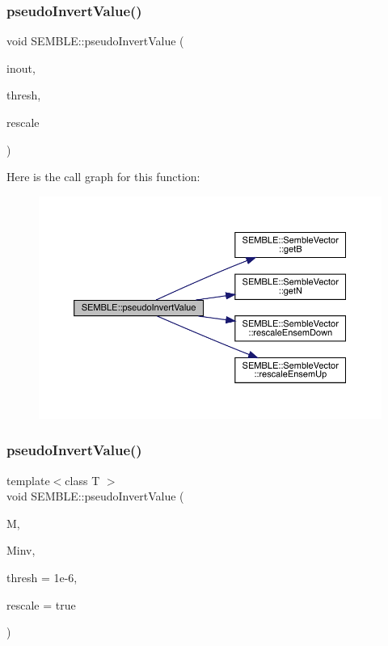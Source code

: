 \subsubsection{\texorpdfstring{pseudoInvertValue()}{pseudoInvertValue()}\hspace{0.1cm}{\footnotesize\ttfamily [1/2]}}
{\footnotesize\ttfamily void S\+E\+M\+B\+L\+E\+::pseudo\+Invert\+Value (\begin{DoxyParamCaption}\item[{\mbox{\hyperlink{structSEMBLE_1_1SembleVector}{Semble\+Vector}}$<$ double $>$ \&}]{inout,  }\item[{double}]{thresh,  }\item[{bool}]{rescale }\end{DoxyParamCaption})}

Here is the call graph for this function\+:
\nopagebreak
\begin{figure}[H]
\begin{center}
\leavevmode
\includegraphics[width=350pt]{d7/dfd/namespaceSEMBLE_aeba19d69ca776dd563e7ccb9975fa4c7_cgraph}
\end{center}
\end{figure}
\mbox{\label{namespaceSEMBLE_abf6d50f5d45b7e87cafac5e1ad6c5225}} 
\subsubsection{\texorpdfstring{pseudoInvertValue()}{pseudoInvertValue()}\hspace{0.1cm}{\footnotesize\ttfamily [2/2]}}
{\footnotesize\ttfamily template$<$class T $>$ \\
void S\+E\+M\+B\+L\+E\+::pseudo\+Invert\+Value (\begin{DoxyParamCaption}\item[{const \mbox{\hyperlink{structSEMBLE_1_1SembleMatrix}{Semble\+Matrix}}$<$ T $>$ \&}]{M,  }\item[{\mbox{\hyperlink{structSEMBLE_1_1SembleMatrix}{Semble\+Matrix}}$<$ T $>$ \&}]{Minv,  }\item[{double}]{thresh = {\ttfamily 1e-\/6},  }\item[{bool}]{rescale = {\ttfamily true} }\end{DoxyParamCaption})}

